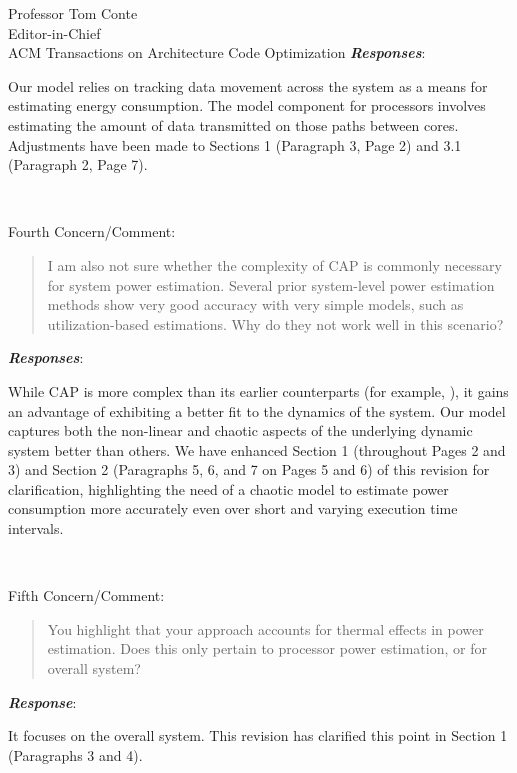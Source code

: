 \documentclass[10pt]{letter} %
\newenvironment{rviewcomment}
{~\\%
\begin{bfseries}}
{\end{bfseries}}
\newcommand{\rviewresponse}{\textbf{\textit{Response}}:}
\newcommand{\rviewresponses}{\textbf{\textit{Responses}}:}
\begin{document}
\begin{letter}{Professor Tom Conte \\
Editor-in-Chief \\
ACM Transactions on Architecture Code Optimization }
\rviewresponses 

Our model relies on tracking data movement across the system as a means
for estimating energy consumption.  The model component for processors
involves estimating the amount of data transmitted on those paths
between cores. Adjustments have been made to Sections 1 (Paragraph 3,
Page 2) and 3.1 (Paragraph 2, Page 7).

\begin{rviewcomment}
  Fourth Concern/Comment:
\end{rviewcomment}
\begin{quote}
  \begin{itshape}
    I am also not sure whether the complexity of CAP is commonly
    necessary for system power estimation. Several prior system-level
    power estimation methods show very good accuracy with very simple
    models, such as utilization-based estimations. Why do they not work
    well in this scenario?
  \end{itshape}
\end{quote}

\rviewresponses

While CAP is more complex than its earlier counterparts (for example,
\cite{Economou2006}), it gains an advantage of exhibiting a better fit
to the dynamics of the system.  Our model captures both the non-linear
and chaotic aspects of the underlying dynamic system better than others.
We have enhanced Section 1 (throughout Pages 2 and 3) and Section 2
(Paragraphs 5, 6, and 7 on Pages 5 and 6) of this revision for
clarification, highlighting the need of a chaotic model to estimate
power consumption more accurately even over short and varying execution
time intervals.

\begin{rviewcomment}
  Fifth Concern/Comment:
\end{rviewcomment}
\begin{quote}
\begin{itshape}
You highlight that your approach accounts for thermal effects in power
estimation. Does this only pertain to processor power estimation, or for
overall system?
\end{itshape}
\end{quote}

\rviewresponse

It focuses on the overall system.  This revision has clarified this
point in Section 1 (Paragraphs 3 and 4).


\end{letter}
\end{document}
